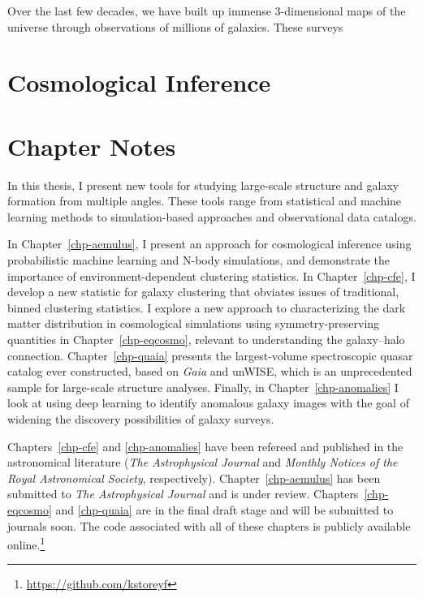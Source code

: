 Over the last few decades, we have built up immense 3-dimensional maps of the universe through observations of millions of galaxies.
These surveys 


\section{Cosmological Inference}


\section{Chapter Notes}

In this thesis, I present new tools for studying large-scale structure and galaxy formation from multiple angles.
These tools range from statistical and machine learning methods to simulation-based approaches and observational data catalogs.

In Chapter~\ref{chp-aemulus}, I present an approach for cosmological inference using probabilistic machine learning and N-body simulations, and demonstrate the importance of environment-dependent clustering statistics.
In Chapter~\ref{chp-cfe}, I develop a new statistic for galaxy clustering that obviates issues of traditional, binned clustering statistics.
I explore a new approach to characterizing the dark matter distribution in cosmological simulations using symmetry-preserving quantities in Chapter~\ref{chp-eqcosmo}, relevant to understanding the galaxy--halo connection.
Chapter~\ref{chp-quaia} presents the largest-volume spectroscopic quasar catalog ever constructed, based on \emph{Gaia} and unWISE, which is an unprecedented sample for large-scale structure analyses.
Finally, in Chapter~\ref{chp-anomalies} I look at using deep learning to identify anomalous galaxy images with the goal of widening the discovery possibilities of galaxy surveys.

Chapters~\ref{chp-cfe} and \ref{chp-anomalies} have been refereed and published in the astronomical literature (\emph{The Astrophysical Journal} and \emph{Monthly Notices of the Royal Astronomical Society}, respectively).
Chapter~\ref{chp-aemulus} has been submitted to \emph{The Astrophysical Journal} and is under review.
Chapters~\ref{chp-eqcosmo} and \ref{chp-quaia} are in the final draft stage and will be submitted to journals soon.
The code associated with all of these chapters is publicly available online.\footnote{\url{https://github.com/kstoreyf}}

